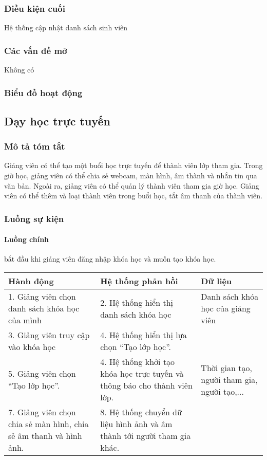 \documentclass[./../main_file.tex]{subfiles}
\begin{document}
\subsubsection{Điều kiện cuối}
Hệ thống cập nhật danh sách sinh viên

\subsubsection{Các vấn đề mở}
Không có

\subsubsection{Biểu đồ hoạt động}

\subsection{Dạy học trực tuyến}
\subsubsection{Mô tả tóm tắt}
Giảng viên có thể tạo một buổi học trực tuyến để thành viên lớp tham gia. Trong giờ học, giảng viên có thể chia sẻ webcam, màn hình, âm thành và nhắn tin qua văn bản. Ngoài ra, giảng viên có thể quản lý thành viên tham gia giờ học. Giảng viên có thể thêm và loại thành viên trong buổi học, tắt âm thanh của thành viên.

\subsubsection{Luồng sự kiện}
\paragraph{Luồng chính}
bắt đầu khi giảng viên đăng nhập khóa học và muốn tạo khóa học.
\begin{longtable}{|p{}|p{}|p{}|}
		\hline
		\textbf{Hành động}              & \textbf{Hệ thống phản hồi}                 & \textbf{Dữ liệu} \\ \hline
		1. Giảng viên chọn danh sách khóa học của mình & 2. Hệ thống hiển thị danh sách khóa học & Danh sách khóa học của giảng viên \\ \hline 
		3. Giảng viên truy cập vào khóa học & 4. Hệ thống hiển thị lựa chọn “Tạo lớp học”. &                  \\ \hline
		5. Giảng viên chọn “Tạo lớp học”.                                  & 4. Hệ thống khởi tạo khóa học trực tuyến và thông báo cho thành viên lớp. &  Thời gian tạo, người tham gia, người tạo,... \\ \hline
		7. Giảng viên chọn chia sẻ màn hình, chia sẻ âm thanh và hình ảnh. & 8. Hệ thống chuyển dữ liệu hình ảnh và âm thành tới người tham gia khác. &  \\ \hline
\end{longtable}
\end{document}
